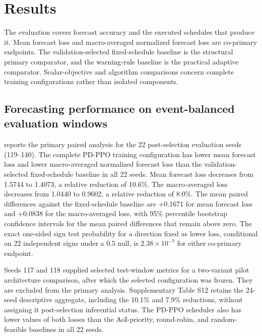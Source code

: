 \section{Results}
\label{sec:results}

The evaluation covers forecast accuracy and the executed schedules that produce
it. Mean forecast loss and macro-averaged normalized forecast loss are co-primary
endpoints. The validation-selected fixed-schedule baseline is the structural
primary comparator, and the warning-rule baseline is the practical adaptive
comparator. Scalar-objective and algorithm comparisons concern complete training
configurations rather than isolated components.

\subsection{Forecasting performance on event-balanced evaluation windows}
\label{sec:main_result}

 reports the primary paired analysis for the 22
post-selection evaluation seeds (119--140). The complete PD-PPO training
configuration has lower mean forecast loss and lower
macro-averaged normalized forecast loss than the validation-selected
fixed-schedule baseline in all 22 seeds. Mean forecast
loss decreases from 1.5744 to 1.4073, a relative reduction of 10.6\%. The
macro-averaged loss decreases from 1.0440 to 0.9602, a relative reduction of
8.0\%. The mean paired differences against the fixed-schedule baseline are +0.1671 for
mean forecast loss and +0.0838 for the macro-averaged loss, with 95\%
percentile bootstrap confidence intervals for the mean paired differences that
remain above zero. The exact one-sided sign test probability for a direction
fixed as lower loss, conditional on 22 independent signs under a 0.5 null, is
$2.38\times10^{-7}$ for either co-primary endpoint.

Seeds 117 and 118 supplied selected test-window metrics for a two-variant pilot
architecture comparison, after which the selected configuration was frozen.
They are excluded from the primary analysis. Supplementary Table S12 retains the
24-seed descriptive aggregate, including the 10.1\% and 7.9\% reductions, without
assigning it post-selection inferential status.
The PD-PPO scheduler also has lower values of both losses than the AoI-priority,
round-robin, and random-feasible baselines in all 22 seeds.



